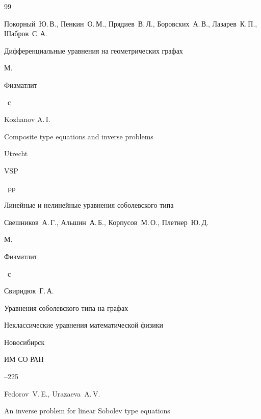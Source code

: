 \begin{thebibliography}{99}




\by Покорный~Ю.\,В., Пенкин~О.\,М.,  Прядиев~В.\,Л., Боровских~А.\,В., Лазарев~К.\,П., Шабров~С.\,А.

\book Дифференциальные уравнения на геометрических графах

\publaddr М.

\publ Физматлит


~с




\by Kozhanov A.\,I.

\book Composite type equations and inverse problems

\publaddr Utrecht

\publ VSP


~pp




\book Линейные и нелинейные уравнения соболевского типа

\by Свешников~А.\,Г.,  Альшин~А.\,Б.,  Корпусов~М.\,О., Плетнер~Ю.\,Д.

\publaddr М.

\publ Физматлит


~с






\by Свиридюк~Г.\,А.

\paper Уравнения соболевского типа на графах

\inbook Неклассические уравнения математической физики

\publaddr Новосибирск

\publ ИМ СО РАН


--225




\by Fedorov~V.\,E., Urazaeva~A.\,V.

\paper  An inverse problem for linear Sobolev type equations


\end{thebibliography}
